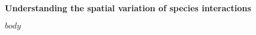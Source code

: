 \documentclass[12pt]{article}
\begin{document}
\centerline{\textbf{\large{Understanding the spatial variation of species interactions}}}
\vspace{5mm}


$body$



 
\end{document}
